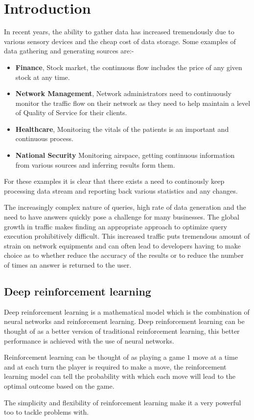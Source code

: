 \chapter{Introduction}
\label{chapter:Introduction}
\thispagestyle{myheadings}
In recent years, the ability to gather data has increased tremendously due to various sensory devices and the cheap cost of data storage. Some examples of data gathering and generating sources are:-
\begin{itemize}
    \item \textbf{Finance}, Stock market, the continuous flow includes the price of any given stock at any time. 
    \item \textbf{Network Management}, Network administrators need to continuously monitor the traffic flow on their network as they need to help maintain a level of Quality of Service for their clients.
    \item \textbf{Healthcare}, Monitoring the vitals of the patients is an important and continuous process. 
    \item \textbf{National Security} Monitoring airspace, getting continuous information from various sources and inferring results form them.
\end{itemize} 
For these examples it is clear that there exists a need to continously keep processing data stream and reporting back various statistics and any changes.
\par The increasingly complex nature of queries, high rate of data generation and the need to have answers quickly pose a challenge for many businesses. The global growth in traffic makes finding an appropriate approach to optimize query execution prohibitively difficult. This increased traffic puts tremendous amount of strain on network equipments and can often lead to developers having to make choice as to whether reduce the accuracy of the results or to reduce the number of times an answer is returned to the user.  


\section{Deep reinforcement learning}
Deep reinforcement learning is a mathematical model which is the combination of neural networks and reinforcement learning. Deep reinforcement learning can be thought of as a better version of traditional reinforcement learning, this better performance is achieved with the use of neural networks.
\par Reinforcement learning can be thought of as playing a game $1$ move at a time and at each turn the player is required to make a move, the reinforcement learning model can tell the probability with which each move will lead to the optimal outcome based on the game.
\par The simplicity and flexibility of reinforcement learning make it a very powerful too to tackle problems with. 

